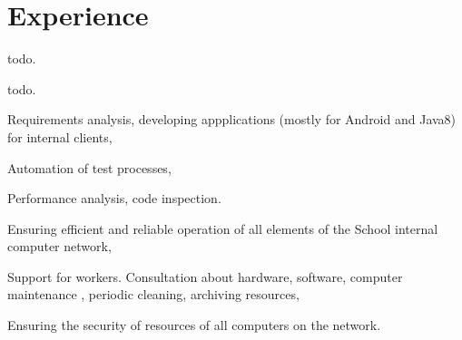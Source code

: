 \documentclass[]{deedy-resume-openfont}
\begin{document}
\hfill
\begin{minipage}[t]{0.66\textwidth} 


\section{Experience}

\vspace{\topsep} %
\begin{tightemize}
\item todo.
\end{tightemize}
\sectionsep

\begin{tightemize}
\item todo.
\end{tightemize}
\sectionsep

\begin{tightemize}
\item Requirements analysis, developing appplications (mostly for Android and Java8) for internal clients,\item Automation of test processes,\item Performance analysis, code inspection.\end{tightemize}
\sectionsep

\begin{tightemize}
\item Ensuring efficient and reliable operation of all elements of the School internal computer network,
\item Support for workers. Consultation about hardware, software, computer maintenance , periodic cleaning, archiving resources, 
\item Ensuring the security of resources of all computers on the network.\end{tightemize}
\sectionsep


\end{minipage}
\end{document}
